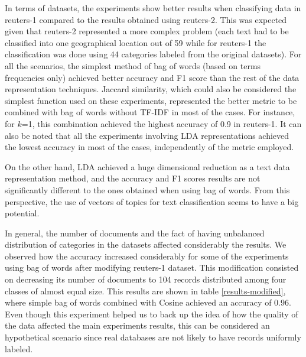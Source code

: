 \documentclass[preprint,12pt,3p]{elsarticle}
\begin{document}
In terms of datasets, the experiments show better results when classifying data in reuters-1 compared to the results obtained using reuters-2. This was expected given that reuters-2 represented a more complex problem (each text had to be classified into one geographical location out of 59 while for reuters-1 the classification was done using 44 categories labeled from the original datasets). For all the scenarios, the simplest method of bag of words (based on terms frequencies only) achieved better accuracy and F1 score than the rest of the data representation techniques. Jaccard similarity, which could also be considered the simplest function used on these experiments, represented the better metric to be combined with bag of words without TF-IDF in most of the cases. For instance, for $k$=1, this combination achieved the highest accuracy of 0.9 in reuters-1. It can also be noted that all the experiments involving LDA representations achieved the lowest accuracy in most of the cases, independently of the metric employed.\par

On the other hand, LDA achieved a huge dimensional reduction as a text data representation method, and the accuracy and F1 scores results are not significantly different to the ones obtained when using bag of words. From this perspective, the use of vectors of topics for text classification seems to have a big potential.\par

In general, the number of documents and the fact of having unbalanced distribution of categories in the datasets affected considerably the results. We observed how the accuracy increased considerably for some of the experiments using bag of words after modifying reuters-1 dataset. This modification consisted on decreasing its number of documents to 104 records distributed among four classes of almost equal size. This results are shown in table \ref{results-modified}, where simple bag of words combined with Cosine achieved an accuracy of 0.96. Even though this experiment helped us to back up the idea of how the quality of the data affected the main experiments results, this can be considered an hypothetical scenario since real databases are not likely to have records uniformly labeled.
\end{document}
